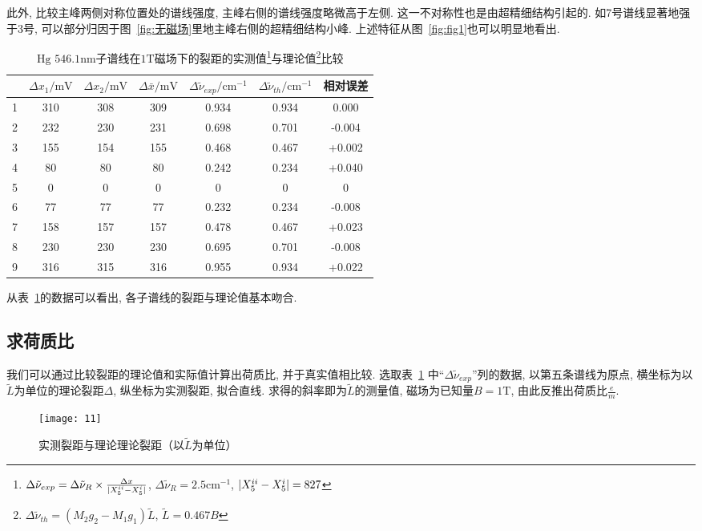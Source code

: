 \documentclass[aps,pre,12pt,preprint,onecolumn,showpacs,showkeys]{revtex4-1}
\begin{document}
此外, 比较主峰两侧对称位置处的谱线强度, 主峰右侧的谱线强度略微高于左侧. 这一不对称性也是由超精细结构引起的. 如7号谱线显著地强于3号, 可以部分归因于图~\ref{fig:无磁场}里地主峰右侧的超精细结构小峰. 上述特征从图~\ref{fig:fig1}也可以明显地看出.

\begin{table}[h]
\caption{\label{tab:table4}%
$\mathrm{Hg}$ $546.1\mathrm{nm}$子谱线在$1\mathrm{T}$磁场下的裂距的实测值\footnote{$\Delta \tilde{\nu}_{exp}=\Delta \tilde{\nu}_R\times \frac{\Delta x}{|X_5^{\uppercase{\romannumeral 2}}-X_5^{\uppercase{\romannumeral 1}}|}$, $\Delta \tilde{\nu}_R=2.5\mathrm{cm}^{-1}$, $|X_5^{\uppercase{\romannumeral 2}}-X_5^{\uppercase{\romannumeral 1}}|=827$}与理论值\footnote{$\Delta \tilde{\nu}_{th}=(M_2 g_2 -M_1 g_1)\tilde{L}$, $\tilde{L}=0.467B$}比较}
\begin{tabular}{|c|c|c|c|c|c|c|}
\hline
&$\Delta x_1/\mathrm{mV}$&$\Delta x_2/\mathrm{mV}$&$\Delta \bar{x}/\mathrm{mV}$&$\Delta \tilde{\nu}_{exp}/\mathrm{cm}^{-1}$&$\Delta \tilde{\nu}_{th}/\mathrm{cm}^{-1}$&相对误差\\\hline
1&310&308&309&0.934&0.934&0.000\\\hline
2&232&230&231&0.698&0.701&-0.004\\\hline
3&155&154&155&0.468&0.467&+0.002\\\hline
4&80&80&80&0.242&0.234&+0.040\\\hline
5&0&0&0&0&0&0\\\hline
6&77&77&77&0.232&0.234&-0.008\\\hline
7&158&157&157&0.478&0.467&+0.023\\\hline
8&230&230&230&0.695&0.701&-0.008\\\hline
9&316&315&316&0.955&0.934&+0.022\\\hline
\end{tabular}
\end{table}

从表~\ref{tab:table4}的数据可以看出, 各子谱线的裂距与理论值基本吻合. 

\subsection{求荷质比}
我们可以通过比较裂距的理论值和实际值计算出荷质比, 并于真实值相比较. 选取表~\ref{tab:table4} 中“$\Delta \tilde{\nu}_{exp}$”列的数据, 以第五条谱线为原点, 横坐标为以$\tilde{L}$为单位的理论裂距$\Delta$, 纵坐标为实测裂距, 拟合直线. 求得的斜率即为$\tilde{L}$的测量值, 磁场为已知量$B=1\mathrm{T}$, 由此反推出荷质比$\frac{e}{m}$. 
\begin{figure}[h]
\centering
\texttt{[image: 11]}
\caption{\label{fig:fig11}%
实测裂距与理论理论裂距（以$\tilde{L}$为单位）}
\end{figure}
\end{document}
